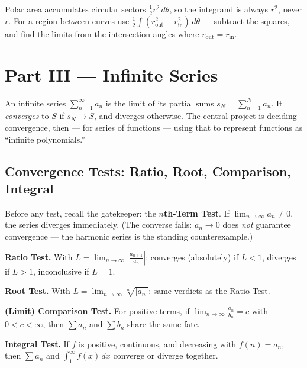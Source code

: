\documentclass[11pt]{article}
\begin{document}
\begin{conceptbox}
Polar area accumulates \textcolor{accentorange}{circular sectors}
$\tfrac12 r^2\,d\theta$, so the integrand is always $r^2$, never $r$. For a region
between curves use $\tfrac12\int(r_{\text{out}}^2-r_{\text{in}}^2)\,d\theta$ ---
\textcolor{accentorange}{subtract the squares}, and find the limits from the
\textcolor{accentorange}{intersection angles} where $r_{\text{out}}=r_{\text{in}}$.
\end{conceptbox}

\clearpage
{}
{}
\section*{Part III --- Infinite Series}
\setcounter{section}{3}

An infinite series $\sum_{n=1}^{\infty} a_n$ is the limit of its partial sums
$s_N=\sum_{n=1}^{N} a_n$. It \emph{converges} to $S$ if $s_N\to S$, and diverges
otherwise. The central project is deciding convergence, then --- for series of
functions --- using that to represent functions as ``infinite polynomials.''

\subsection{Convergence Tests: Ratio, Root, Comparison, Integral}

Before any test, recall the gatekeeper: the \textbf{$n$th-Term Test}. If
$\lim_{n\to\infty} a_n \ne 0$, the series diverges immediately. (The converse fails:
$a_n\to0$ does \emph{not} guarantee convergence --- the harmonic series is the
standing counterexample.)

\begin{formulabox}
\textbf{Ratio Test.} With $L=\displaystyle\lim_{n\to\infty}\left|\frac{a_{n+1}}{a_n}\right|$:
converges (absolutely) if $L<1$, diverges if $L>1$, inconclusive if $L=1$.

\smallskip
\textbf{Root Test.} With $L=\displaystyle\lim_{n\to\infty}\sqrt[n]{|a_n|}$: same
verdicts as the Ratio Test.

\smallskip
\textbf{(Limit) Comparison Test.} For positive terms, if
$\displaystyle\lim_{n\to\infty}\frac{a_n}{b_n}=c$ with $0<c<\infty$, then
$\sum a_n$ and $\sum b_n$ share the same fate.

\smallskip
\textbf{Integral Test.} If $f$ is positive, continuous, and decreasing with
$f(n)=a_n$, then $\sum a_n$ and $\displaystyle\int_1^\infty f(x)\,dx$ converge or
diverge together.
\end{formulabox}
\end{document}
